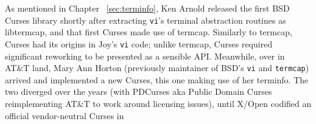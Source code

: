 As mentioned in Chapter ~\ref{sec:terminfo}, Ken Arnold released the first BSD
Curses library shortly after extracting \texttt{vi}'s terminal abstraction routines
as libtermcap, and that first Curses made use of termcap\cite{cursesexplained}.
Similarly to termcap, Curses had its origins in Joy's \texttt{vi} code; unlike
termcap, Curses required significant reworking to be presented as a sensible
API. Meanwhile, over in AT\&T land, Mary Ann Horton (previously maintainer of
BSD's \texttt{vi} and \texttt{termcap}) arrived and implemented a new Curses,
this one making use of her terminfo. The two diverged over the years (with PDCurses
aka Public Domain Curses reimplementing AT\&T to work around licensing issues),
until X/Open codified an official vendor-neutral Curses in 
